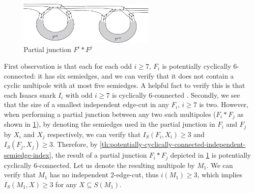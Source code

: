 \documentclass[12pt, twoside]{book}
\begin{document}
\begin{example}
	\begin{figure}
		\centering
		\includegraphics[width=0.6\textwidth]{images/Gi-first-partial-junction}
		\caption{Partial junction $F^i*F^j$}
		\label{fig:Gi-first-partial-junction}
	\end{figure}

	First observation is that each for each odd $i\geq 7$, $F_i$ is potentially cyclically 6-connected: it has six semiedges, and we can verify that it does not contain a cyclic multipole with at most five semiedges. A helpful fact to verify this is that each Isaacs snark $I_i$ with odd $i\geq 7$ is cyclically 6-connected \cite{Mazak2022}. Secondly, we see that the size of a smallest independent edge-cut in any $F_i$, $i\geq 7$ is two. However, when performing a partial junction between any two such multipoles ($F_i*F_j$ as shown in \cref{fig:Gi-first-partial-junction}), by denoting the semiedges used in the partial junction in $F_i$ and $F_j$ by $X_i$ and $X_j$ respectively, we can verify that $I_S(F_i,X_i)\geq 3$ and $I_S(F_j,X_j)\geq 3$. Therefore, by \cref{th:potentially-cyclically-connected-independent-semiedge-index}, the result of a partial junction $F_i*F_j$ depicted in \cref{fig:Gi-first-partial-junction}  is potentially cyclically 6-connected. Let us denote the resulting multipole by $M_1$. We can verify that $M_1$ has no independent 2-edge-cut, thus $i(M_1)\geq 3$, which implies $I_S(M_1, X)\geq 3$ for any $X\subseteq S(M_1)$.
		

\end{example}
\end{document}
